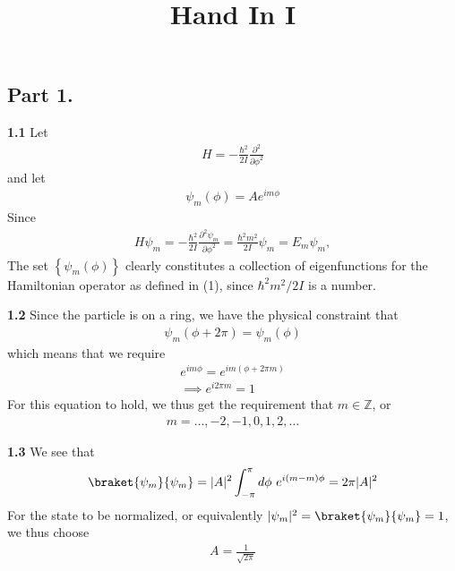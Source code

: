 \documentclass[a4paper]{article}
\title{Hand In I}
\begin{document}
    \maketitle
    \subsection*{Part 1.}
    \textbf{1.1} 
    Let \begin{align*}
        H = -\frac{\hbar  ^{2} }{2I} \frac{\partial ^{2} }{\partial \phi ^{2} } \tag{1}
    \end{align*}
    and let \begin{align*}
        \psi _m (\phi ) = A e^{i m \phi }
    \end{align*}
    Since \begin{align*}
        H \psi _m = -\frac{\hbar ^{2} }{2I} \frac{\partial ^{2} \psi _m}{\partial \phi ^{2} } =  \frac{\hbar ^{2} m ^{2} }{2I} \psi _m = E_m \psi _m,
    \end{align*}
    The set \(\left\{ \psi _m(\phi ) \right\} \) clearly constitutes a collection of eigenfunctions for the Hamiltonian operator as defined in (1), since \(\hbar ^{2} m^{2} /2I\) is a number.  

    \textbf{1.2} Since the particle is on a ring, we have the physical constraint that \begin{align*}
        \psi _m (\phi + 2\pi ) = \psi _m (\phi )
    \end{align*} which means that we require \begin{align*}
        e^{i m \phi } = e ^{i m (\phi + 2 \pi  m)}\\
        \implies e^{i 2\pi m} = 1
    \end{align*}
    For this equation to hold, we thus get the requirement that \(m \in \mathbb{Z}\), or \begin{align*}
        m = \dots , -2, -1, 0, 1, 2, \dots
    \end{align*} 

    \textbf{1.3} We see that \begin{align*}
        \braket{\psi _m}{\psi _m} = |A|^{2} \int_{- \pi }^{\pi} d \phi\ e^{i (m - m)\phi } = 2 \pi|A|^{2}  
    \end{align*}
    For the state to be normalized, or equivalently \(|\psi _m|^2 = \braket{\psi _m}{\psi _m} = 1 \), we thus choose \begin{align*}
        A = \frac{1}{\sqrt{2\pi } }
    \end{align*} 
\end{document}

